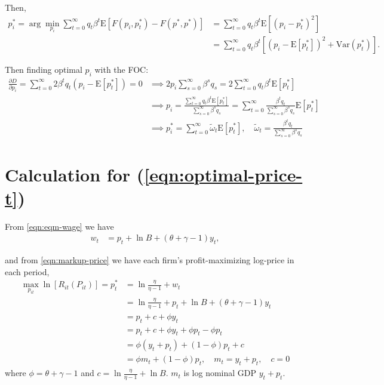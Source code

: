 \documentclass{article}
\newcommand{\E}[1]{\mathrm{E}\left[#1\right]}
\newcommand{\var}[1]{\mathrm{Var}\left(#1\right)}
\newcommand{\?}{\textcolor{red}{(?)}} %
\begin{document}
        Then,
        \begin{align}
            p_i^*
            = \arg\min_{p_i} \sum_{t=0}^\infty q_t \beta^t \E{F(p_i, p_t^*) - F(p^*, p^*)}
            &=\sum_{t=0}^\infty q_t \beta^t \E{(p_i - p_t^*)^2}
            \\
            &= \sum_{t=0}^\infty q_t \beta^t \left[(p_i - \E{p_t^*})^2 + \var{p_t^*}\right].
        \end{align}
        
        Then finding optimal $p_i$ with the FOC:
        \begin{align}
            \frac{\partial D}{\partial p_i}
            = \sum_{t=0}^\infty 2 \beta^t q_t (p_i - \E{p_t^*})
            = 0
            &\implies
            2p_i \sum_{s=0}^\infty \beta^s q_s = 2\sum_{t=0}^\infty q_t \beta^t \E{p_t^*}
            \\
            &\implies
            p_i = \frac{\sum_{t=0}^\infty q_t \beta^t \E{p_t^*}}{\sum_{s=0}^\infty \beta^s q_s}
            = \sum_{t=0}^\infty \frac{\beta^t q_t}{\sum_{s=0}^\infty \beta^s q_s} \E{p_t^*}
            \\
            &\implies
            p_i^* = \sum_{t=0}^\infty \tilde\omega_t \E{p_t^*}, \quad \tilde\omega_t = \frac{\beta^t q_t}{\sum_{s=0}^\infty \beta^s q_s}
        \end{align}
        
        \section{Calculation for (\ref{eqn:optimal-price-t})}
        \label{calc:optimal-price-t}
        
        From \eqref{eqn:eqm-wage} we have
        \begin{align}
            w_t &= p_t + \ln{B} + (\theta + \gamma - 1) y_t,
        \end{align}
        
        and from \eqref{eqn:markup-price} we have each firm's profit-maximizing log-price in each period,
        \begin{align}
            \max_{p_{it}}\ln[R_{it}(P_{it})]
            = p_t^* &= \ln{\frac{\eta}{\eta - 1}} + w_t
            \\
            &= \ln{\frac{\eta}{\eta - 1}}
            + p_t + \ln{B} + (\theta + \gamma - 1) y_t
            \\
            &= p_t + c + \phi y_t
            \\
            &= p_t + c + \phi y_t + \phi p_t - \phi p_t
            \\
            &= \phi (y_t + p_t) + (1-\phi) p_t + c
            \\
            &= \phi m_t + (1-\phi) p_t, \quad m_t = y_t + p_t, \quad c = 0
        \end{align}
        where $\phi = \theta + \gamma - 1$ and $c = \ln{\frac{\eta}{\eta - 1}} + \ln{B}$. $m_t$ is log nominal GDP $y_t + p_t$.
        
\end{document}
